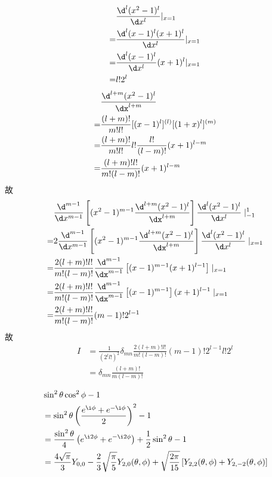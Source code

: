 \documentclass{phyasgn}
\begin{document}
\begin{sol}[1]
\begin{align*}
        &\frac{\d^l(x^2-1)^l}{\d x^l}|_{x=1}\\
        =&\frac{\d^l(x-1)^l(x+1)^l}{\d x^l}|_{x=1}\\
        =&\frac{\d^l(x-1)^l}{\d x^l}(x+1)^l|_{x=1}\\
        =&l!2^l
    \end{align*}
    \begin{align*}
        &\frac{\d^{l+m}(x^2-1)^l}{\dx^{l+m}}\\
        =&\frac{(l+m)!}{m!l!}[(x-1)^l]^{(l)}[(1+x)^l]^{(m)}\\
        =&\frac{(l+m)!}{m!l!}l!\frac{l!}{(l-m)!}(x+1)^{l-m}\\
        =&\frac{(l+m)!l!}{m!(l-m)!}(x+1)^{l-m}
    \end{align*}
    故
    \begin{align*}
        &\frac{\d^{m-1}}{\d x^{m-1}}\left[(x^2-1)^{m-1}\frac{\d^{l+m}(x^2-1)^l}{\dx^{l+m}}\right]\frac{\d^l(x^2-1)^l}{\d x^l}\mid ^1_{-1}\\
        =&2\frac{\d^{m-1}}{\d x^{m-1}}\left[(x^2-1)^{m-1}\frac{\d^{l+m}(x^2-1)^l}{\dx^{l+m}}\right]\frac{\d^l(x^2-1)^l}{\d x^l}\mid_{x=1}\\
        =&\frac{2(l+m)!l!}{m!(l-m)!}\frac{\d^{m-1}}{\dx^{m-1}}\left[(x-1)^{m-1}(x+1)^{l-1}\right]\mid_{x=1}\\
        =&\frac{2(l+m)!l!}{m!(l-m)!}\frac{\d^{m-1}}{\dx^{m-1}}\left[(x-1)^{m-1}\right](x+1)^{l-1}\mid_{x=1}\\
        =&\frac{2(l+m)!l!}{m!(l-m)!}(m-1)!2^{l-1}
    \end{align*}
    故
    \begin{align*}
        I&=\frac{1}{(2^ll!)^2}\delta_{mn}\frac{2(l+m)!l!}{m!(l-m)!}(m-1)!2^{l-1}l!2^l\\
        &=\delta_{mn}\frac{(l+m)!}{m(l-m)!}
    \end{align*}
\end{sol}\par


\begin{sol}[2]
    \begin{align*}
        &\sin^2\theta\cos^2\phi-1\\
        &=\sin^2\theta\left(\frac{e^{\i\phi}+e^{-\i\phi}}{2}\right)^2-1\\
        &=\frac{\sin^2\theta}{4}\left(e^{\i2\phi}+e^{-\i2\phi}\right)+\frac{1}{2}\sin^2\theta-1\\
        &=\frac{4\sqrt{\pi}}{3}Y_{0,0}-\frac{2}{3}\sqrt{\frac{\pi}{5}}Y_{2,0}(\theta,\phi)+\sqrt{\frac{2\pi}{15}}\left[Y_{2,2}(\theta,\phi)+Y_{2,-2}(\theta,\phi)\right]
    \end{align*}
\end{sol}\par
\end{document}
